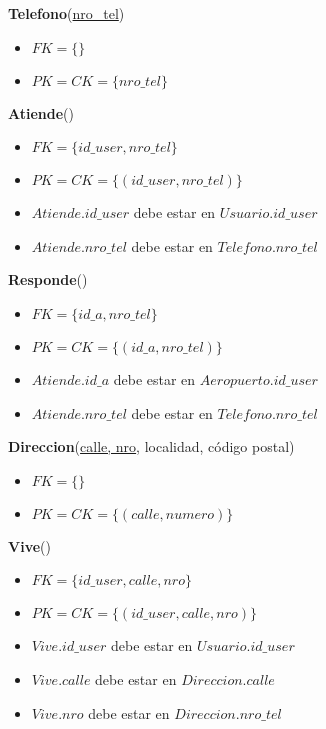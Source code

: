 \noindent
\textbf{Telefono}(\underline{nro\_tel})
\begin{itemize}[noitemsep]
    \item $FK = \{\}$
    \item $PK = CK = \{nro\_tel\}$    
\end{itemize}

\vspace*{0.1cm}
\noindent
\textbf{Atiende}(\underline{})
\begin{itemize}[noitemsep]
	\item $FK = \{id\_user, nro\_tel\}$
	\item $PK = CK = \{(id\_user, nro\_tel)\}$
	\item $Atiende.id\_user$ debe estar en $Usuario.id\_user$
	\item $Atiende.nro\_tel$ debe estar en $Telefono.nro\_tel$
\end{itemize}

\newpage
\vspace*{0.1cm}
\noindent
\textbf{Responde}(\underline{})
\begin{itemize}[noitemsep]
    \item $FK = \{id\_a, nro\_tel\}$
    \item $PK = CK = \{(id\_a, nro\_tel)\}$
    \item $Atiende.id\_a$ debe estar en $Aeropuerto.id\_user$
    \item $Atiende.nro\_tel$ debe estar en $Telefono.nro\_tel$
\end{itemize}


\vspace*{0.1cm}
\noindent
\textbf{Direccion}(\underline{calle, nro}, 
                    localidad, código postal)
\begin{itemize}[noitemsep]
    \item $FK = \{\}$
    \item $PK = CK = \{(calle, numero)\}$    
\end{itemize}


\vspace*{0.1cm}
\noindent
\textbf{Vive}(\underline{})
\begin{itemize}[noitemsep]
    \item $FK = \{id\_user, calle, nro\}$
    \item $PK = CK = \{(id\_user, calle, nro)\}$
    \item $Vive.id\_user$ debe estar en $Usuario.id\_user$
    \item $Vive.calle$ debe estar en $Direccion.calle$
    \item $Vive.nro$ debe estar en $Direccion.nro\_tel$
\end{itemize}

